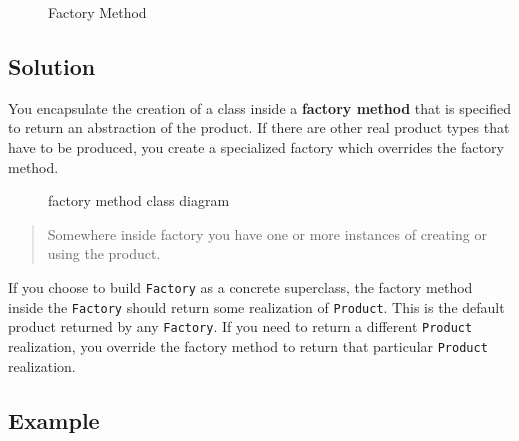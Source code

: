 \begin{figure}
\centering
{}
\caption{Factory Method}
\end{figure}

\subsection{Solution}\label{creational-patterns.md__solution}

You encapsulate the creation of a class inside a \textbf{factory method}
that is specified to return an abstraction of the product. If there are
other real product types that have to be produced, you create a
specialized factory which overrides the factory method.

\begin{figure}
\centering
\pandocbounded{}
\caption{factory method class diagram}
\end{figure}

\begin{quote}
Somewhere inside factory you have one or more instances of creating or
using the product.
\end{quote}

If you choose to build \texttt{Factory} as a concrete superclass, the
factory method inside the \texttt{Factory} should return some
realization of \texttt{Product}. This is the default product returned by
any \texttt{Factory}. If you need to return a different \texttt{Product}
realization, you override the factory method to return that particular
\texttt{Product} realization.

\subsection{Example}\label{creational-patterns.md__example}

